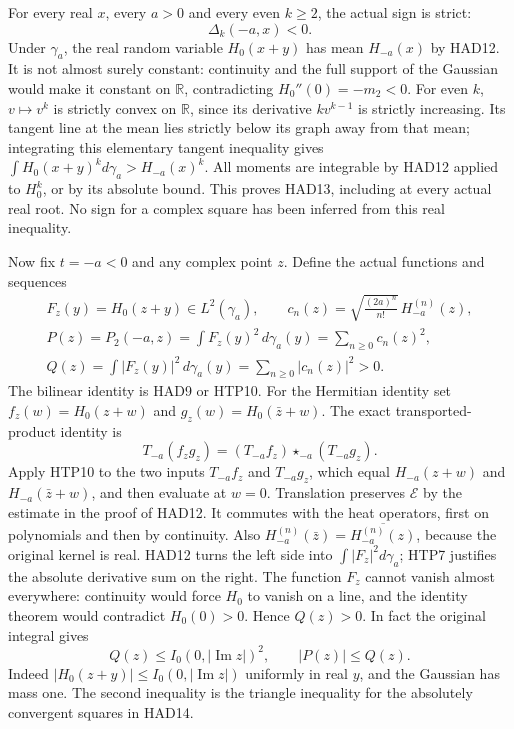 For every real $x$, every $a>0$ and every even $k\ge2$,
the actual sign is strict:
\begin{equation}\tag{HAD13}
             \Delta_k(-a,x)<0.
\end{equation}
Under $\gamma_a$, the real random variable $H_0(x+y)$ has
mean $H_{-a}(x)$ by HAD12. It is not almost surely
constant: continuity and the full support of the Gaussian
would make it constant on $\mathbb R$, contradicting
$H_0''(0)=-m_2<0$. For even $k$, $v\mapsto v^k$ is
strictly convex on $\mathbb R$, since its derivative
$kv^{k-1}$ is strictly increasing. Its tangent line at the
mean lies strictly below its graph away from that mean;
integrating this elementary tangent inequality gives
$\int H_0(x+y)^k d\gamma_a>H_{-a}(x)^k$.
All moments are integrable by HAD12 applied to $H_0^k$,
or by its absolute bound. This proves HAD13, including
at every actual real root. No sign for a complex square
has been inferred from this real inequality.

Now fix $t=-a<0$ and any complex point $z$. Define the
actual functions and sequences
\begin{equation}\tag{HAD14}
\begin{gathered}
 F_z(y)=H_0(z+y)\in L^2(\gamma_a),\qquad
 c_n(z)=\sqrt{\frac{(2a)^n}{n!}}\,H_{-a}^{(n)}(z),\\
 P(z)=P_2(-a,z)=\int F_z(y)^2\,d\gamma_a(y)
                         =\sum_{n\ge0}c_n(z)^2,\\
 Q(z)=\int|F_z(y)|^2\,d\gamma_a(y)
                         =\sum_{n\ge0}|c_n(z)|^2>0.
\end{gathered}
\end{equation}
The bilinear identity is HAD9 or HTP10. For the Hermitian
identity set $f_z(w)=H_0(z+w)$ and $g_z(w)=H_0(\bar z+w)$.
The exact transported-product identity is
\[
 T_{-a}(f_zg_z)
       =(T_{-a}f_z)\star_{-a}(T_{-a}g_z).
\]
Apply HTP10 to the two inputs $T_{-a}f_z$ and $T_{-a}g_z$,
which equal $H_{-a}(z+w)$ and $H_{-a}(\bar z+w)$,
and then evaluate at $w=0$. Translation preserves
$\mathcal E$ by the estimate in the proof of HAD12.
It commutes with the heat operators, first on polynomials
and then by continuity. Also
$H_{-a}^{(n)}(\bar z)=\overline{H_{-a}^{(n)}(z)}$,
because the original kernel is real. HAD12 turns the
left side into $\int|F_z|^2d\gamma_a$; HTP7 justifies
the absolute derivative sum on the right.
The function $F_z$ cannot vanish almost everywhere:
continuity would force $H_0$ to vanish on a line, and
the identity theorem would contradict $H_0(0)>0$.
Hence $Q(z)>0$. In fact the original integral gives
\begin{equation}\tag{HAD15}
 Q(z)\le I_0(0,|\operatorname{Im}z|)^2,
 \qquad |P(z)|\le Q(z).
\end{equation}
Indeed $|H_0(z+y)|\le I_0(0,|\operatorname{Im}z|)$
uniformly in real $y$, and the Gaussian has mass one.
The second inequality is the triangle inequality for
the absolutely convergent squares in HAD14.

